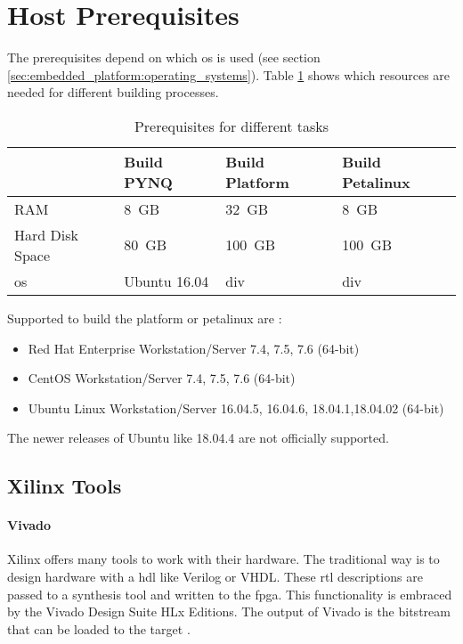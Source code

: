 \section{Host Prerequisites}
\label{sec:embedded_platform:host_prerequisites}

The prerequisites depend on which \acrshort{os} is used (see section \ref{sec:embedded_platform:operating_systems}).
Table \ref{tab:prerequisits_hardware} shows which resources are needed for different building processes. 

\begin{table}[hb]
  \caption{Prerequisites for different tasks}
  \label{tab:prerequisits_hardware}
  \centering
  \begin{tabular}{llll} %
    \toprule
    \textbf{} & \textbf{Build PYNQ} \cite{avnet_pynq_github} & \textbf{Build Platform} \cite{vitis_user_guide} & \textbf{Build Petalinux} \cite{petalinux_user_guide} \\ %
    \midrule
    RAM & \SI{8}{GB} & \SI{32}{GB} & \SI{8}{GB} \\ %
    Hard Disk Space & \SI{80}{GB} & \SI{100}{GB} & \SI{100}{GB} \\ %
    \acrlong{os} & Ubuntu 16.04 & div & div \\ %
    \bottomrule
  \end{tabular}
\end{table}

Supported  to build the platform or petalinux are \cite{vitis_user_guide} \cite{petalinux_user_guide}:
\begin{itemize}
  \item Red Hat Enterprise Workstation/Server 7.4, 7.5, 7.6 (64-bit)
  \item CentOS Workstation/Server 7.4, 7.5, 7.6 (64-bit)
  \item Ubuntu Linux Workstation/Server 16.04.5, 16.04.6, 18.04.1,18.04.02 (64-bit)
\end{itemize}
The newer releases of Ubuntu like 18.04.4 are not officially supported.

\subsection{Xilinx Tools}
\paragraph{Vivado}
\label{subsec:embedded_platform:host_prerequisites:xilinx_tools}
Xilinx offers many tools to work with their hardware.
The traditional way is to design hardware with a \acrfull{hdl} like Verilog or VHDL.
These \acrfull{rtl} descriptions are passed to a synthesis tool and written to the \acrshort{fpga}.
This functionality is embraced by the Vivado Design Suite HLx Editions.
The output of Vivado is the bitstream that can be loaded to the target \cite{vivado_user_guide}.


